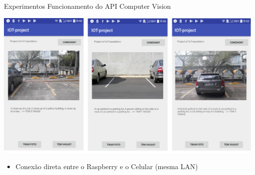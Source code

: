 \documentclass{beamer}
\begin{document}
\begin{frame}{Experimentos}
Funcionamento do API Computer Vision

\begin{center}
\includegraphics[width=.9\textwidth]{img/app_2.png}   
\end{center}
\begin{itemize}\tiny
 \item Conexão direta entre o Raspberry e o Celular (mesma LAN)  
\end{itemize}

\end{frame}
\end{document}
